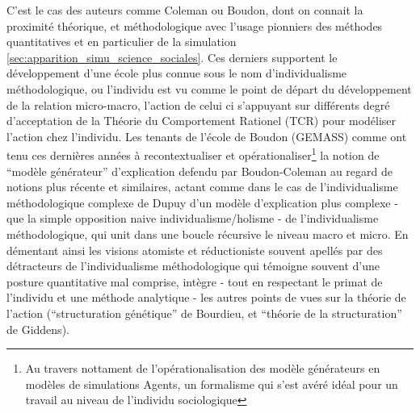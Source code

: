 C'est le cas des auteurs comme Coleman ou Boudon, dont on connait la proximité théorique, et méthodologique avec l'usage pionniers des méthodes quantitatives et en particulier de la simulation \ref{sec:apparition_simu_science_sociales}. Ces derniers supportent le développement d'une école plus connue sous le nom d'individualisme méthodologique, ou l'individu est vu comme le point de départ du développement de la relation micro-macro, l'action de celui ci s'appuyant sur différents degré d'acceptation de la Théorie du Comportement Rationel (TCR) pour modéliser l'action chez l'individu. Les tenants de l'école de Boudon (GEMASS) comme \textcite{Manzo2007, Manzo2005} ont tenu ces dernières années à recontextualiser et opérationaliser\footnote{Au travers nottament de l'opérationalisation des modèle générateurs en modèles de simulations Agents, un formalisme qui s'est avéré idéal pour un travail au niveau de l'individu sociologique} la notion de \enquote{modèle générateur}  d'explication defendu par Boudon-Coleman au regard de notions plus récente et similaires, actant comme dans le cas de l'individualisme méthodologique complexe de Dupuy d'un modèle d'explication plus complexe  - que la simple opposition naive individualisme/holisme - de l'individualisme méthodologique, qui unit dans une boucle récursive le niveau macro et micro. En démentant ainsi les visions atomiste et réductioniste souvent apellés par des détracteurs de l'individualisme méthodologique qui témoigne souvent d'une posture quantitative mal comprise, \textcite{Manzo2007} intègre - tout en respectant le primat de l'individu et une méthode analytique - les autres points de vues sur la théorie de l'action (\enquote{structuration génétique} de Bourdieu, et \enquote{théorie de la structuration} de Giddens).


